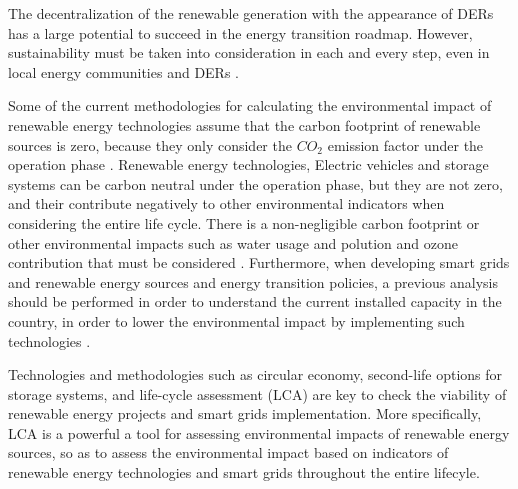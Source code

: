 The decentralization of the renewable generation with the appearance of DERs has a large potential to succeed in the energy transition roadmap. However, sustainability must be taken into consideration in each and every step, even in local energy communities and DERs \cite{AMPONSAH2014461}.

Some of the current methodologies for calculating the environmental impact of renewable energy technologies assume that the carbon footprint of renewable sources is zero, because they only consider the $CO_2$ emission factor under the operation phase \cite{IRENA2020}. Renewable energy technologies, Electric vehicles and storage systems can be carbon neutral under the operation phase, but they are not zero, and their contribute negatively to other environmental indicators when considering the entire life cycle. There is a non-negligible carbon footprint or other environmental impacts such as water usage and polution and ozone contribution that must be considered \cite{en12214214, Moro2017, Jiang2018}. Furthermore, when developing smart grids and renewable energy sources and energy transition policies, a previous analysis should be performed in order to understand the current installed capacity in the country, in order to lower the environmental impact by implementing such technologies \cite{Treyer2014}.
%

Technologies and methodologies such as circular economy, second-life options for storage systems, and life-cycle assessment (LCA) are key to check the viability of renewable energy projects and smart grids implementation. More specifically, LCA is a powerful a tool for assessing environmental impacts of renewable energy sources, so as to assess the environmental impact based on indicators of renewable energy technologies and smart grids throughout the entire lifecyle. 



\newpage 
